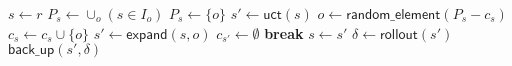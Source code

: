 \begin{algorithm}[H]
	\caption{$\mathsf{O-MCTS}(r, max\_time)$}
	\label{alg:omcts}
	\begin{algorithmic}[1]
		 \label{alg:omcts:mainloop}
			\State $s \gets r$ %
			 \label{alg:omcts:innerloop}
				 \label{alg:omcts:sp}
					\State $P_s \gets \cup_o ( s \in I_o)$
				\Else
					\State $P_s \gets \{o\}$ %
				\EndIf \label{alg:omcts:ep}
					\State $s' \gets \mathsf{uct}(s)$ \label{alg:omcts:uct}
				\Else \label{alg:omcts:sexpand}
					\State $o \gets \mathsf{random\_element}(P_s - c_s)$ 
					\State $c_s \gets c_s \cup \{o\}$
					\State $s' \gets \mathsf{expand}(s, o)$
					\State $c_{s'} \gets \emptyset$
					\State \textbf{break} \label{alg:omcts:break}
				\EndIf \label{alg:omcts:eexpand}
				\State $s \gets s'$ \label{alg:omcts:ss}
			\EndWhile
			\State $\delta \gets \mathsf{rollout}(s')$ \label{alg:omcts:rollout}
			\State $\mathsf{back\_up}(s', \delta)$ \label{alg:omcts:backup}
		\EndWhile
	\end{algorithmic}
\end{algorithm}

